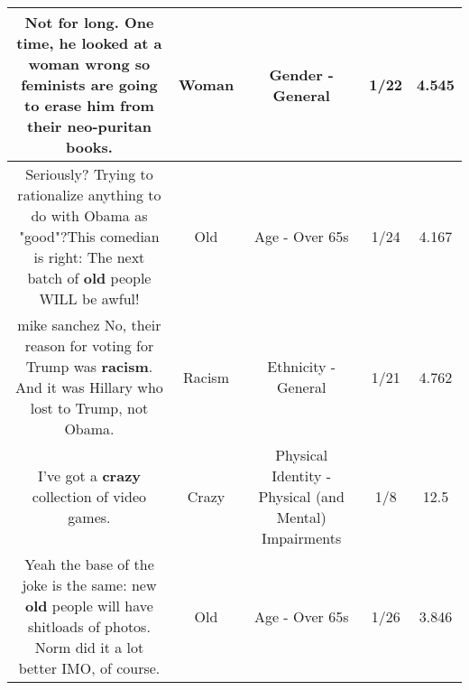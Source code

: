 \documentclass[11pt]{article}
\newlength\mylength
\begin{document}
\begin{center}
\begin{longtable}{|C{.65\mylength}|C{.30\mylength}|C{.12\mylength}|C{.12\mylength}|C{.12\mylength}|}
  \small Not for long.  One time, he looked at a \textbf{woman} wrong so feminists are going to erase him from their neo-puritan books.\normalsize   & Woman & Gender - General & 1/22 & 4.545 \\  \hline
  \small Seriously? Trying to rationalize anything to do with Obama as "good"?This comedian is right: The next batch of \textbf{old} people WILL be awful!\normalsize   & Old & Age - Over 65s & 1/24 & 4.167 \\  \hline
  \small mike sanchez  No, their reason for voting for Trump was \textbf{racism}. And it was Hillary who lost to Trump, not Obama.\normalsize   & Racism & Ethnicity - General & 1/21 & 4.762 \\  \hline
  \small I've got a \textbf{crazy} collection of video games.\normalsize   & Crazy & Physical Identity - Physical (and Mental) Impairments & 1/8 & 12.5 \\  \hline
  \small Yeah the base of the joke is the same: new \textbf{old} people will have shitloads of photos. Norm did it a lot better IMO, of course.\normalsize   & Old & Age - Over 65s & 1/26 & 3.846 \\  \hline
  
\end{longtable}
\end{center}
\end{document}
